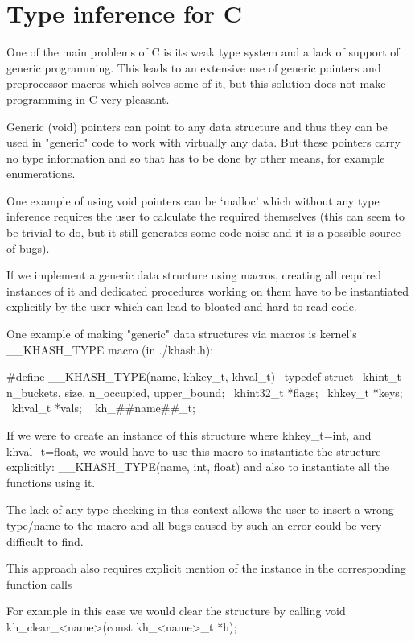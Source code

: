 \chapter{Type inference for C}

One of the main problems of C is its weak type system and a lack of support of generic programming.
This leads to an extensive use of generic pointers and preprocessor macros which solves some of it,
but this solution does not make programming in C very pleasant. %

Generic (void) pointers can point to any data structure and thus they can be used in "generic" code
to work with virtually any data. But these pointers carry no type information and so that has to be
done by other means, for example enumerations.

One example of using void pointers can be `malloc' which without any type inference requires the user
to calculate the required themselves (this can seem to be trivial to do, but it still generates some code
noise and it is a possible source of bugs).

If we implement a generic data structure using macros, creating all required instances of
it and dedicated procedures working on them have to be instantiated explicitly by the user
which can lead to bloated and hard to read code.

One example of making "generic" data structures via macros is kernel's __KHASH_TYPE macro (in ./khash.h):

#define __KHASH_TYPE(name, khkey_t, khval_t) \
	typedef struct { \
		khint_t n_buckets, size, n_occupied, upper_bound; \
		khint32_t *flags; \
		khkey_t *keys; \
		khval_t *vals; \
	} kh_##name##_t;

If we were to create an instance of this structure where khkey_t=int, and khval_t=float,
we would have to use this macro to instantiate the structure explicitly:
__KHASH_TYPE(name, int, float) and also to instantiate all the functions using it.

The lack of any type checking in this context allows the user to insert a wrong type/name to the macro
and all bugs caused by such an error could be very difficult to find.

This approach also requires explicit mention of the instance in the corresponding function calls

For example in this case we would clear the structure by calling
void kh_clear_<name>(const kh_<name>_t *h);


